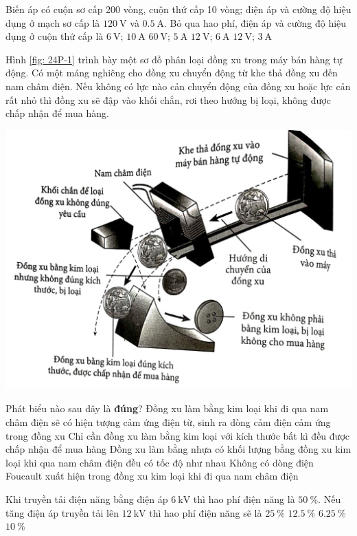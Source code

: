 \begin{ex}
	Biến áp có cuộn sơ cấp 200 vòng, cuộn thứ cấp 10 vòng; điện áp và cường độ hiệu dụng ở mạch sơ cấp là $\SI{120}{\volt}$ và $\SI{0.5}{\ampere}$. Bỏ qua hao phí, điện áp và cường độ hiệu dụng ở cuộn thứ cấp là
	\choice
	{\True $\SI{6}{\volt}$; $\SI{10}{\ampere}$}
	{$\SI{60}{\volt}$; $\SI{5}{\ampere}$}
	{$\SI{12}{\volt}$; $\SI{6}{\ampere}$}
	{$\SI{12}{\volt}$; $\SI{3}{\ampere}$}
\end{ex}

\begin{ex}
	Hình \ref{fig: 24P-1} trình bày một sơ đồ phân loại đồng xu trong máy bán hàng tự động. Có một máng nghiêng cho đồng xu chuyển động từ khe thả đồng xu đến nam châm điện. Nếu không có lực nào cản chuyển động của đồng xu hoặc lực cản rất nhỏ thì đồng xu sẽ đập vào khối chắn, rơi theo hướng bị loại, không được chấp nhận để mua hàng.
	\begin{center}
		\includegraphics[width=0.6\linewidth]{figs/VN12-Y24-PH-SYL-024P-1}
		\label{fig: 24P-1}
	\end{center}
	Phát biểu nào sau đây là \textbf{đúng}?
	\choice
	{\True Đồng xu làm bằng kim loại khi đi qua nam châm điện sẽ có hiện tượng cảm ứng điện từ, sinh ra dòng cảm điện cảm ứng trong đồng xu}
	{Chỉ cần đồng xu làm bằng kim loại với kích thước bất kì đều được chấp nhận để mua hàng}
	{Đồng xu làm bằng nhựa có khối lượng bằng đồng xu kim loại khi qua nam châm điện đều có tốc độ như nhau}
	{Không có dòng điện Foucault xuất hiện trong đồng xu kim loại khi đi qua nam châm điện}
	\loigiai{}
\end{ex}
\begin{ex}
	Khi truyền tải điện năng bằng điện áp $\SI{6}{\kilo\volt}$ thì hao phí điện năng là $\SI{50}{\percent}$. Nếu tăng điện áp truyền tải lên $\SI{12}{\kilo\volt}$ thì hao phí điện năng sẽ là
	\choice
	{$\SI{25}{\percent}$}
	{\True $\SI{12.5}{\percent}$}
	{$\SI{6.25}{\percent}$}
	{$\SI{10}{\percent}$}
\end{ex}
